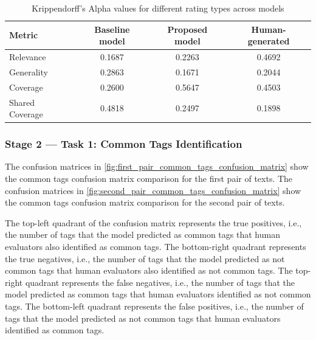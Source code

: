 \begin{table}[htbp]
    \centering
    \begin{tabular}{lccc}
        \hline
        \textbf{Metric} & \textbf{Baseline model} & \textbf{Proposed model} & \textbf{Human-generated} \\
        \hline
        Relevance       & 0.1687            & 0.2263                  & 0.4692                   \\
        Generality      & 0.2863            & 0.1671                  & 0.2044                   \\
        Coverage        & 0.2600            & 0.5647                  & 0.4503                   \\
        Shared Coverage & 0.4818            & 0.2497                  & 0.1898                   \\
        \hline
    \end{tabular}
    \caption{Krippendorff's Alpha values for different rating types across models}
    \label{tab:kalpha}
\end{table}

\subsubsection{Stage 2 — Task 1: Common Tags Identification}
The confusion matrices in \cref{fig:first_pair_common_tags_confusion_matrix} show the common tags confusion matrix comparison for the first pair of texts. The confusion matrices in \cref{fig:second_pair_common_tags_confusion_matrix} show the common tags confusion matrix comparison for the second pair of texts.

The top-left quadrant of the confusion matrix represents the true positives, i.e., the number of tags that the model predicted as common tags that human evaluators also identified as common tags. The bottom-right quadrant represents the true negatives, i.e., the number of tags that the model predicted as not common tags that human evaluators also identified as not common tags. The top-right quadrant represents the false negatives, i.e., the number of tags that the model predicted as common tags that human evaluators identified as not common tags. The bottom-left quadrant represents the false positives, i.e., the number of tags that the model predicted as not common tags that human evaluators identified as common tags.

